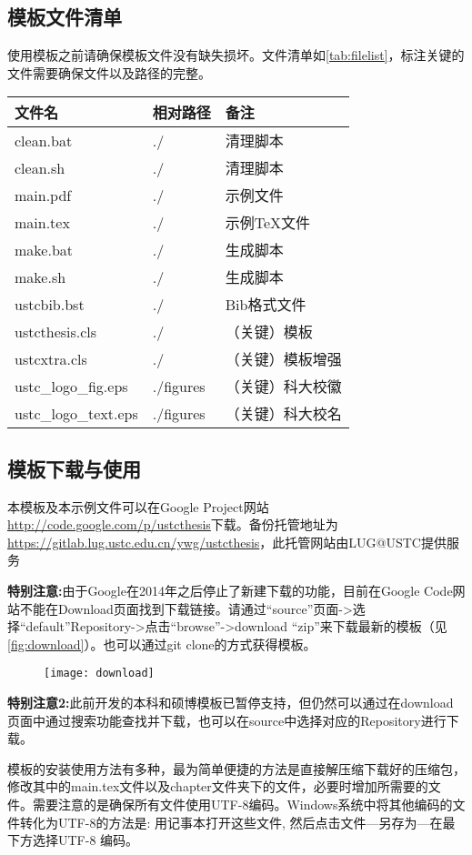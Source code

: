 \subsection{模板文件清单}
使用模板之前请确保模板文件没有缺失损坏。文件清单如\autoref{tab:filelist}，标注关键的文件需要确保文件以及路径的完整。
\begin{table}[htp]
\centering
{}
\label{tab:filelist}
\begin{tabular}{lll}
\toprule
文件名&相对路径&备注\tabularnewline
\midrule
clean.bat			&./			&清理脚本\tabularnewline
clean.sh			&./			&清理脚本\tabularnewline
main.pdf			&./			&示例文件\tabularnewline
main.tex 			&./			&示例TeX文件\tabularnewline
make.bat			&./			&生成脚本\tabularnewline
make.sh				&./			&生成脚本\tabularnewline
ustcbib.bst		&./			&Bib格式文件\tabularnewline
ustcthesis.cls		&./			&（关键）模板\tabularnewline
ustcxtra.cls		&./			&（关键）模板增强\tabularnewline
ustc\_logo\_fig.eps	&./figures	&（关键）科大校徽\tabularnewline
ustc\_logo\_text.eps&./figures	&（关键）科大校名\tabularnewline
\bottomrule
\end{tabular}
\end{table}

\subsection{模板下载与使用}
本模板及本示例文件可以在Google Project网站\url{http://code.google.com/p/ustcthesis}下载。备份托管地址为\url{https://gitlab.lug.ustc.edu.cn/ywg/ustcthesis}，此托管网站由LUG@USTC提供服务

\textbf{特别注意:}由于Google在2014年之后停止了新建下载的功能，目前在Google Code网站不能在Download页面找到下载链接。请通过“source”页面->选择“default”Repository->点击“browse”->download “zip”来下载最新的模板（见\autoref{fig:download}）。也可以通过git clone的方式获得模板。

\begin{figure}
\centering
\texttt{[image: download]}
\label{fig:download}
\end{figure}

\textbf{特别注意2:}此前开发的本科和硕博模板已暂停支持，但仍然可以通过在download页面中通过搜索功能查找并下载，也可以在source中选择对应的Repository进行下载。

模板的安装使用方法有多种，最为简单便捷的方法是直接解压缩下载好的压缩包，修改其中的main.tex文件以及chapter文件夹下的文件，必要时增加所需要的文件。需要注意的是确保所有文件使用UTF-8编码。Windows系统中将其他编码的文件转化为UTF-8的方法是: 用记事本打开这些文件, 然后点击文件—另存为—在最下方选择UTF-8 编码。

